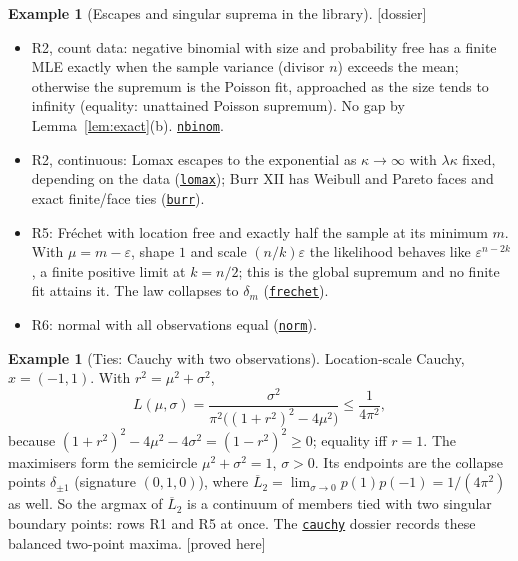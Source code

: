 \documentclass[11pt]{article}
\newcommand{\bL}{\overline L}
\newcommand{\status}[1]{\textsf{[#1]}}
\theoremstyle{definition}
\newtheorem{example}[theorem]{Example}
\theoremstyle{remark}
\begin{document}
\begin{example}[Escapes and singular suprema in the library]\label{ex:escapes}
\status{dossier}
\begin{itemize}
\item R2, count data: negative binomial with size and probability free has a
  finite MLE exactly when the sample variance (divisor $n$) exceeds the
  mean; otherwise the supremum is the Poisson fit, approached as the size
  tends to infinity (equality: unattained Poisson supremum). No gap by
  Lemma~\ref{lem:exact}(b). \href{../../univariateML-cpp/include/cppunivariate/distributions/nbinom/README.md}{\texttt{nbinom}}.
\item R2, continuous: Lomax escapes to the exponential as $\kappa\to\infty$
  with $\lambda\kappa$ fixed, depending on the data (\href{../../univariateML-cpp/include/cppunivariate/distributions/lomax/README.md}{\texttt{lomax}});
  Burr XII has Weibull and Pareto faces and exact finite/face ties
  (\href{../../univariateML-cpp/include/cppunivariate/distributions/burr/README.md}{\texttt{burr}}).
\item R5: Fr\'echet with location free and exactly half the sample at its
  minimum $m$. With $\mu=m-\varepsilon$, shape $1$ and scale
  $(n/k)\varepsilon$ the likelihood behaves like $\varepsilon^{n-2k}$, a finite
  positive limit at $k=n/2$; this is the global supremum and no finite fit
  attains it. The law collapses to $\delta_m$ (\href{../../univariateML-cpp/include/cppunivariate/distributions/frechet/README.md}{\texttt{frechet}}).
\item R6: normal with all observations equal (\href{../../univariateML-cpp/include/cppunivariate/distributions/norm/README.md}{\texttt{norm}}).
\end{itemize}
\end{example}

\begin{example}[Ties: Cauchy with two observations]\label{ex:cauchy2}
Location-scale Cauchy, $x=(-1,1)$. With $r^2=\mu^2+\sigma^2$,
\[
 L(\mu,\sigma)=\frac{\sigma^2}{\pi^2\bigl((1+r^2)^2-4\mu^2\bigr)}\le\frac1{4\pi^2},
\]
because $(1+r^2)^2-4\mu^2-4\sigma^2=(1-r^2)^2\ge0$; equality iff $r=1$. The
maximisers form the semicircle $\mu^2+\sigma^2=1$, $\sigma>0$. Its endpoints
are the collapse points $\delta_{\pm1}$ (signature $(0,1,0)$), where
$\bL_2=\lim_{\sigma\to0}p(1)p(-1)=1/(4\pi^2)$ as well. So the argmax of $\bL_2$
is a continuum of members tied with two singular boundary points: rows R1
and R5 at once. The \href{../../univariateML-cpp/include/cppunivariate/distributions/cauchy/README.md}{\texttt{cauchy}} dossier records these balanced
two-point maxima. \status{proved here}
\end{example}
\end{document}
